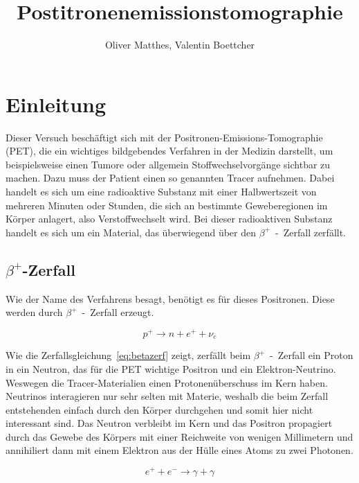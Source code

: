 \documentclass[slug=PET, room=Andreas-Schubert-Bau\,\ 424A, supervisor=Carsten\ Bittrich, coursedate=10.\ 01.\ 2020]{../../Lab_Report_LaTeX/lab_report}
\title{Postitronenemissionstomographie}
\author{Oliver Matthes, Valentin Boettcher}
\begin{document}
\maketitle

\section{Einleitung}
\label{sec:einl}

Dieser Versuch beschäftigt sich mit der
Positronen-Emissions-Tomographie (PET), die ein wichtiges bildgebendes
Verfahren in der Medizin darstellt, um beispielsweise einen Tumore
oder allgemein Stoffwechselvorgänge sichtbar zu machen.  Dazu muss der
Patient einen so genannten Tracer aufnehmen. Dabei handelt es sich um
eine radioaktive Substanz mit einer Halbwertszeit von mehreren Minuten
oder Stunden, die sich an bestimmte Geweberegionen im Körper anlagert,
also Verstoffwechselt wird. Bei dieser radioaktiven Substanz handelt
es sich um ein Material, das überwiegend über den
\(\beta^+\)~-~Zerfall zerfällt.

\subsection{\(\beta^+\)-Zerfall}
\label{sec:betazerf}

Wie der Name des Verfahrens besagt, benötigt es für dieses
Positronen. Diese werden durch \(\beta^+\)~-~Zerfall erzeugt.

\begin{equation}\label{eq:betazerf}
        p^+ \rightarrow n + e^+ + \nu_e
\end{equation}

Wie die Zerfallsgleichung~\eqref{eq:betazerf} zeigt, zerfällt beim
\(\beta^+\)~-~Zerfall ein Proton in ein Neutron, das für die PET
wichtige Positron und ein Elektron-Neutrino. Weswegen die
Tracer-Materialien einen Protonenüberschuss im Kern haben.  Neutrinos
interagieren nur sehr selten mit Materie, weshalb die beim Zerfall
entstehenden einfach durch den Körper durchgehen und somit hier nicht
interessant sind. Das Neutron verbleibt im Kern und das Positron
propagiert durch das Gewebe des Körpers mit einer Reichweite von
wenigen Millimetern und annihiliert dann mit einem Elektron aus der
Hülle eines Atoms zu zwei Photonen.

\begin{equation}\label{eq:annihi}
        e^+ + e^- \rightarrow \gamma + \gamma
\end{equation}
\end{document}
